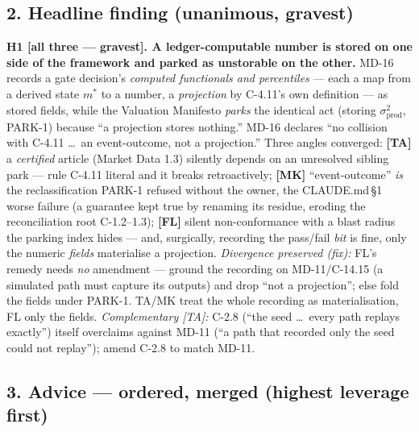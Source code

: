 \subsection*{2. Headline finding (unanimous, gravest)}

\noindent\textbf{H1 [all three --- gravest]. A ledger-computable number is stored on one side of
the framework and parked as unstorable on the other.} MD-16 records a gate decision's
\emph{computed functionals and percentiles} --- each a map from a derived state $m^\ast$ to a
number, a \emph{projection} by C-4.11's own definition --- as stored fields, while the Valuation
Manifesto \emph{parks} the identical act (storing $\sigma_{\mathrm{prod}}^2$, PARK-1) because ``a
projection stores nothing.'' MD-16 declares ``no collision with C-4.11 \dots\ an event-outcome,
not a projection.'' Three angles converged: \textbf{[TA]} a \emph{certified} article (Market
Data 1.3) silently depends on an unresolved sibling park --- rule C-4.11 literal and it breaks
retroactively; \textbf{[MK]} ``event-outcome'' \emph{is} the reclassification PARK-1 refused
without the owner, the CLAUDE.md\,\S1 worse failure (a guarantee kept true by renaming its
residue, eroding the reconciliation root C-1.2--1.3); \textbf{[FL]} silent non-conformance with
a blast radius the parking index hides --- and, surgically, recording the pass/fail \emph{bit}
is fine, only the numeric \emph{fields} materialise a projection.
\emph{Divergence preserved (fix):} FL's remedy needs \emph{no} amendment --- ground the
recording on MD-11/C-14.15 (a simulated path must capture its outputs) and drop ``not a
projection''; else fold the fields under PARK-1. TA/MK treat the whole recording as
materialisation, FL only the fields. \emph{Complementary [TA]:} C-2.8 (``the seed \dots\ every
path replays exactly'') itself overclaims against MD-11 (``a path that recorded only the seed
could not replay''); amend C-2.8 to match MD-11.

\subsection*{3. Advice --- ordered, merged (highest leverage first)}

